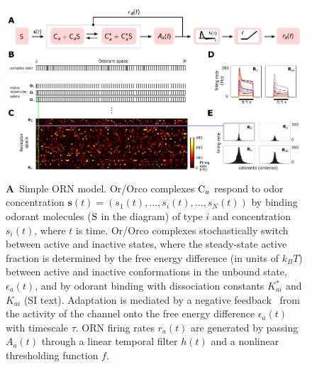 \documentclass[9pt,twocolumn,twoside]{pnas-new}
\begin{document}
\begin{figure}[!tb]
	\centering
	\begin{subfigure}[t]{\linewidth}
		\label{fig:tuning_curves_a}
	\end{subfigure}
	\begin{subfigure}[t]{0\linewidth}
		\label{fig:tuning_curves_b}
	\end{subfigure}
	\begin{subfigure}[t]{0\linewidth}
		\label{fig:tuning_curves_c}
	\end{subfigure}
	\begin{subfigure}[t]{0\linewidth}
		\label{fig:tuning_curves_d}
	\end{subfigure}
	\begin{subfigure}[t]{0\linewidth}
		\label{fig:tuning_curves_e}
	\end{subfigure}
	\includegraphics[width=\linewidth]{figures/1_tuning_curves}
	\caption{\footnotesize{
		\textbf{A}~Simple ORN model. Or/Orco complexes $\textup{C}_a$ respond to odor concentration $\mathbf{s}(t)=(s_1(t),...,s_i(t),...,s_N(t))$ by binding odorant molecules ($\textup{S}$ in the diagram) of type $i$ and concentration $s_i(t)$, where $t$ is time. Or/Orco complexes stochastically switch between active and inactive states, where the steady-state active fraction is determined by the free energy difference (in units of $k_B T$) between active and inactive conformations in the unbound state, $\epsilon_a(t)$, and by odorant binding with dissociation constants $K^*_{ai}$ and $K_{ai}$ (SI text). Adaptation is mediated by a negative feedback~\cite{nagel_wilson_biophysical} from the activity of the channel onto the free energy difference $\epsilon_a(t)$ with timescale $\tau$. ORN firing rates $r_a(t)$ are generated by passing $A_a(t)$ through a linear temporal filter $h(t)$ and a nonlinear thresholding function $f$. 
}}
\end{figure}
\end{document}
